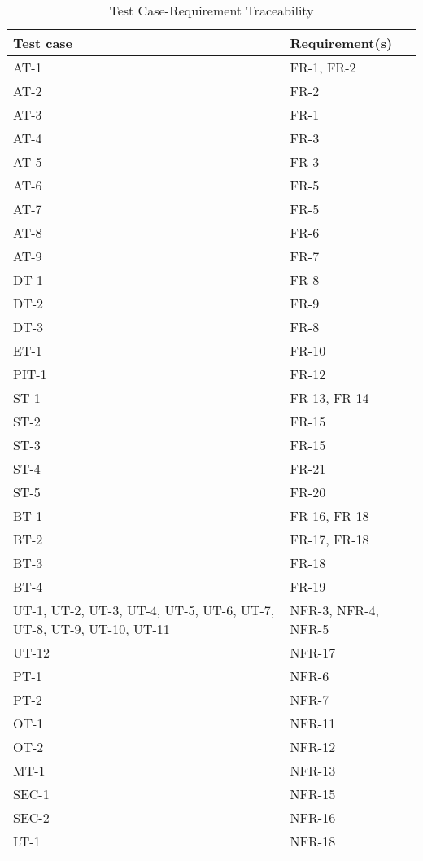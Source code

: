\documentclass[12pt, titlepage]{article}
\begin{document}
\begin{longtable}{|p{7cm}|p{7cm}|}
  \caption{Test Case-Requirement Traceability}\\  
  \hline
  Test case & Requirement(s)\\
  \hline
  AT-1 & FR-1, FR-2\\
  \hline
  AT-2 & FR-2\\
  \hline
  AT-3 & FR-1\\
  \hline
  AT-4 & FR-3\\
  \hline
  AT-5 & FR-3\\
  \hline
  AT-6 & FR-5\\
  \hline
  AT-7 & FR-5\\
  \hline
  AT-8 & FR-6\\
  \hline
  AT-9 & FR-7\\
  \hline
  DT-1 & FR-8\\
  \hline
  DT-2 & FR-9\\
  \hline
  DT-3 & FR-8\\
  \hline
  ET-1 & FR-10\\
  \hline
  PIT-1 & FR-12\\
  \hline
  ST-1 & FR-13, FR-14\\
  \hline
  ST-2 & FR-15\\
  \hline
  ST-3 & FR-15\\
  \hline
  ST-4 & FR-21\\
  \hline
  ST-5 & FR-20\\
  \hline
  BT-1 & FR-16, FR-18\\
  \hline
  BT-2 & FR-17, FR-18\\
  \hline
  BT-3 & FR-18\\
  \hline
  BT-4 & FR-19\\
  \hline
  UT-1, UT-2, UT-3, UT-4, UT-5, UT-6, UT-7, UT-8, UT-9, UT-10, UT-11 & NFR-3, NFR-4, NFR-5\\
  \hline
  UT-12 & NFR-17\\
  \hline
  PT-1 & NFR-6\\
  \hline
  PT-2 & NFR-7\\
  \hline
  OT-1 & NFR-11\\
  \hline
  OT-2 & NFR-12\\
  \hline
  MT-1 & NFR-13\\
  \hline
  SEC-1 & NFR-15\\
  \hline
  SEC-2 & NFR-16\\
  \hline
  LT-1 & NFR-18\\
  \hline
\end{longtable}
\end{document}
